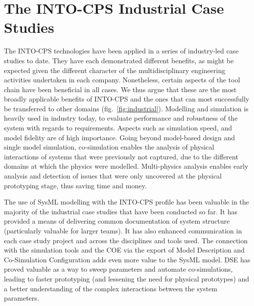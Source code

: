 
\section{The INTO-CPS Industrial Case Studies}\label{sec:casestudies}


The INTO-CPS technologies have been applied in a series of industry-led case studies to date. They have each demonstrated different benefits, as might be expected given the different character of the multidisciplinary engineering activities undertaken in each company. Nonetheless, certain aspects of the tool chain have been beneficial in all cases. We thus argue that these are the most broadly applicable benefits of INTO-CPS and the ones that can most successfully be transferred to other domains (fig.~\ref{fig:industrial}).
Modelling and simulation is heavily used in industry today, to evaluate performance and robustness of the system with regards to requirements. Aspects such as simulation speed, and model fidelity are of high importance. Going beyond model-based design and single model simulation, co-simulation enables the analysis of physical interactions of systems that were previously not captured, due to the different domains at which the physics were modelled. Multi-physics analysis enables early analysis and detection of issues that were only uncovered at the physical prototyping stage, thus saving time and money.

The use of SysML modelling with the INTO-CPS profile has been valuable in the majority of the industrial case studies that have been conducted so far. It has provided a means of delivering common documentation of system structure (particularly valuable for larger teams). It has also enhanced communication in each case study project and across the disciplines and tools used. The connection with the simulation tools and the COE via the export of Model Description and Co-Simulation Configuration adds even more value to the SysML model.
DSE has proved valuable as a way to sweep parameters and automate co-simulations, leading to faster prototyping (and lessening the need for physical prototypes) and a better understanding of the complex interactions between the system parameters. 

